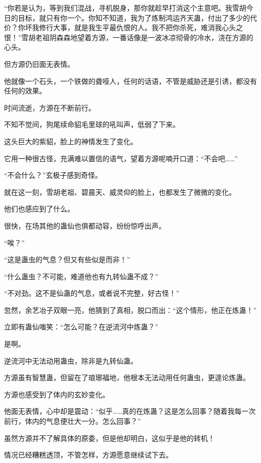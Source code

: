 
\begin{this_body}



“你若是认为，等到我们混战，寻机脱身，那你就趁早打消这个主意吧。我雪胡今日的目标，就只有你一个。你知不知道，我为了炼制鸿运齐天蛊，付出了多少的代价？你坏我修行大事，就是我生平最仇恨的人。我不把你杀死，难消我心头之恨！”雪胡老祖阴森森地望着方源，一番话像是一波冰凉彻骨的冷水，浇在方源的心头。

但方源仍旧面无表情。

他就像一个石头，一个铁做的聋哑人，任何的话语，不管是威胁还是引诱，都没有任何的效果。

时间流逝，方源在不断前行。

不知不觉间，狗尾续命貂毛里球的吼叫声，低弱了下来。

这头巨大的紫貂，脸上的神情发生了变化。

它用一种很古怪，充满难以置信的语气，望着方源呢喃开口道：“不会吧……”

“不会什么？”玄极子感到奇怪。

就在这一刻，雪胡老祖、碧晨天、威灵仰的脸上，也都发生了微微的变化。

他们也感应到了什么。

很快，在场其他的蛊仙也俱都动容，纷纷惊呼出声。

“唉？”

“这是蛊虫的气息？但又有些似是而非！”

“什么蛊虫？不可能，难道他也有九转仙蛊不成？”

“不对劲。这不是仙蛊的气息，或者说不完整，好古怪！”

忽然，余艺冶子双眼一亮，他猜到了真相，脱口而出：“这个情形，他正在炼蛊！”

立即有蛊仙嗤笑：“怎么可能？在逆流河中炼蛊？”

是啊。

逆流河中无法动用蛊虫，除非是九转仙蛊。

方源虽有智慧蛊，但留在了琅琊福地，他根本无法动用任何蛊虫，更遑论炼蛊。

方源也感受到了体内的玄妙变化。

他面无表情，心中却是震动：“似乎……真的在炼蛊？这是怎么回事？随着我每一次前行，体内的气息便壮大一分。怎么回事？”

虽然方源并不了解具体的原委，但是他却明白，这似乎是他的转机！

情况已经糟糕透顶，不管怎样，方源愿意继续试下去。


\end{this_body}
